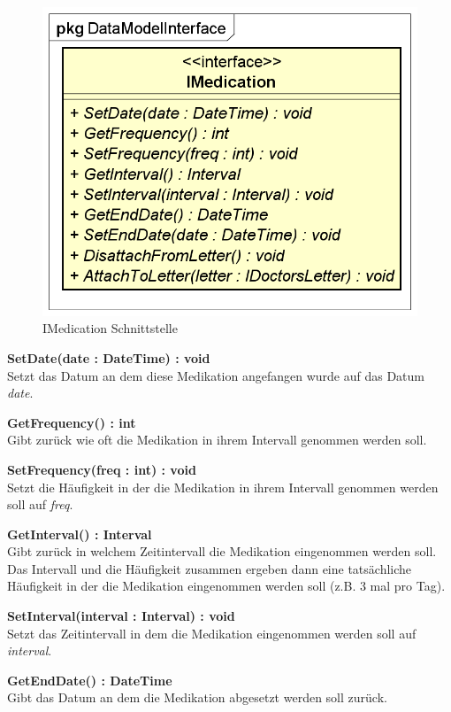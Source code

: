 \documentclass[a4paper]{scrreprt}
\begin{document}
\begin{figure}[H]
\centering
\includegraphics[width=0.55\textheight]{graphics/Klassendiagramme/Model/IMedication.png}
\caption{IMedication Schnittstelle}
\end{figure}
\textbf{SetDate(date : DateTime) : void}\\
Setzt das Datum an dem diese Medikation angefangen wurde auf das Datum \textit{date}.

\textbf{GetFrequency() : int}\\
Gibt zurück wie oft die Medikation in ihrem Intervall genommen werden soll.

\textbf{SetFrequency(freq : int) : void}\\
Setzt die Häufigkeit in der die Medikation in ihrem Intervall genommen werden soll auf \textit{freq}.

\textbf{GetInterval() : Interval}\\
Gibt zurück in welchem Zeitintervall die Medikation eingenommen werden soll. Das Intervall und die Häufigkeit zusammen ergeben dann eine tatsächliche Häufigkeit in der die Medikation eingenommen werden soll (z.B. 3 mal pro Tag).

\textbf{SetInterval(interval : Interval) : void}\\
Setzt das Zeitintervall in dem die Medikation eingenommen werden soll auf \textit{interval}.

\textbf{GetEndDate() : DateTime}\\
Gibt das Datum an dem die Medikation abgesetzt werden soll zurück.
\end{document}

